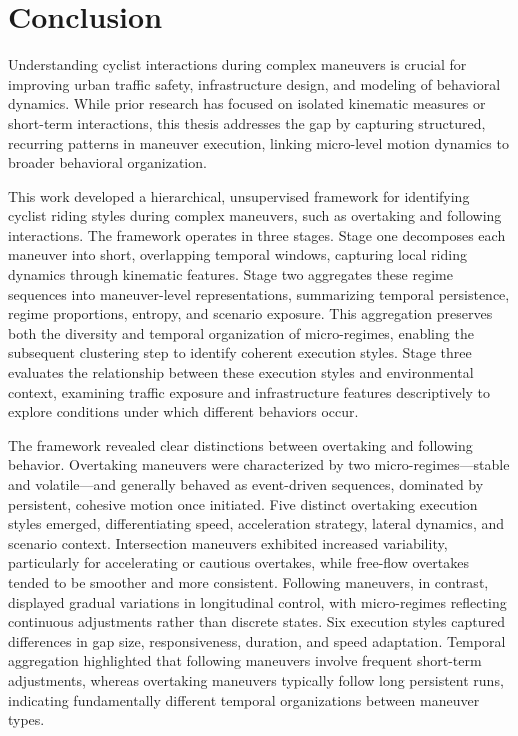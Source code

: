 \chapter{Conclusion}

Understanding cyclist interactions during complex maneuvers is crucial for improving urban traffic safety, infrastructure design, and modeling of behavioral dynamics. While prior research has focused on isolated kinematic measures or short-term interactions, this thesis addresses the gap by capturing structured, recurring patterns in maneuver execution, linking micro-level motion dynamics to broader behavioral organization.

This work developed a hierarchical, unsupervised framework for identifying cyclist riding styles during complex maneuvers, such as overtaking and following interactions. The framework operates in three stages. Stage one decomposes each maneuver into short, overlapping temporal windows, capturing local riding dynamics through kinematic features. Stage two aggregates these regime sequences into maneuver-level representations, summarizing temporal persistence, regime proportions, entropy, and scenario exposure. This aggregation preserves both the diversity and temporal organization of micro-regimes, enabling the subsequent clustering step to identify coherent execution styles. Stage three evaluates the relationship between these execution styles and environmental context, examining traffic exposure and infrastructure features descriptively to explore conditions under which different behaviors occur.

The framework revealed clear distinctions between overtaking and following behavior. Overtaking maneuvers were characterized by two micro-regimes—stable and volatile—and generally behaved as event-driven sequences, dominated by persistent, cohesive motion once initiated. Five distinct overtaking execution styles emerged, differentiating speed, acceleration strategy, lateral dynamics, and scenario context. Intersection maneuvers exhibited increased variability, particularly for accelerating or cautious overtakes, while free-flow overtakes tended to be smoother and more consistent. Following maneuvers, in contrast, displayed gradual variations in longitudinal control, with micro-regimes reflecting continuous adjustments rather than discrete states. Six execution styles captured differences in gap size, responsiveness, duration, and speed adaptation. Temporal aggregation highlighted that following maneuvers involve frequent short-term adjustments, whereas overtaking maneuvers typically follow long persistent runs, indicating fundamentally different temporal organizations between maneuver types.

